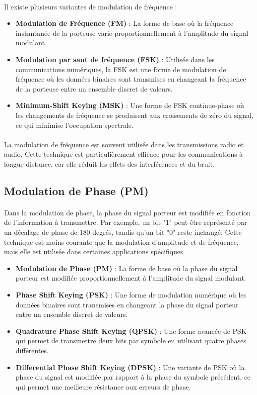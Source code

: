 \documentclass[a4paper,draft,twocolumn]{report}
\begin{document}
\paragraph{}Il existe plusieurs variantes de modulation de fréquence : 
\begin{itemize}
    \item \textbf{Modulation de Fréquence (FM)} : La forme de base où la fréquence instantanée de la porteuse varie proportionnellement à l'amplitude du signal modulant.
    \item \textbf{Modulation par saut de fréquence (FSK)} : Utilisée dans les communications numériques, la FSK est une forme de modulation de fréquence où les données binaires sont transmises en changeant la fréquence de la porteuse entre un ensemble discret de valeurs.
    \item \textbf{Minimum-Shift Keying (MSK)} : Une forme de FSK continue-phase où les changements de fréquence se produisent aux croisements de zéro du signal, ce qui minimise l'occupation spectrale.
\end{itemize}
\paragraph{}La modulation de fréquence est souvent utilisée dans les transmissions radio et audio. Cette technique est particulièrement efficace pour les communications à longue distance, car elle réduit les effets des interférences et du bruit.

\subsection{Modulation de Phase (PM)}
\paragraph{}Dans la modulation de phase, la phase du signal porteur est modifiée en fonction de l'information à transmettre. Par exemple, un bit "1" peut être représenté par un décalage de phase de 180 degrés, tandis qu'un bit "0" reste inchangé. Cette technique est moins courante que la modulation d'amplitude et de fréquence, mais elle est utilisée dans certaines applications spécifiques.
\begin{itemize}
    \item \textbf{Modulation de Phase (PM)} : La forme de base où la phase du signal porteur est modifiée proportionnellement à l'amplitude du signal modulant.
    \item \textbf{Phase Shift Keying (PSK)} : Une forme de modulation numérique où les données binaires sont transmises en changeant la phase du signal porteur entre un ensemble discret de valeurs.
    \item \textbf{Quadrature Phase Shift Keying (QPSK)} : Une forme avancée de PSK qui permet de transmettre deux bits par symbole en utilisant quatre phases différentes.
    \item \textbf{Differential Phase Shift Keying (DPSK)} : Une variante de PSK où la phase du signal est modifiée par rapport à la phase du symbole précédent, ce qui permet une meilleure résistance aux erreurs de phase.
\end{itemize}
\end{document}
